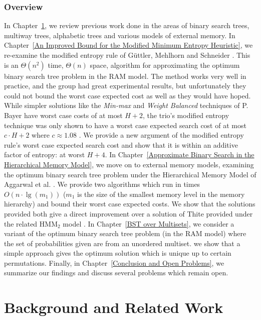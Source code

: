 \documentclass[]{beamer}
\theoremstyle{plain}
\begin{document}
\begin{frame} \frametitle{Overview}

In Chapter~\ref{Background and Related Work}, we review previous work done in the areas of binary search trees, multiway trees, alphabetic trees and various models of external memory. In Chapter~\ref{An Improved Bound for the Modified Minimum Entropy Heuristic}, we re-examine the modified entropy rule of G{\"u}ttler, Mehlhorn and Schneider \cite{guttler1980binary}. This is an $\Theta(n^2)$ time, $\Theta(n)$ space, algorithm for approximating the optimum binary search tree problem in the RAM model. The method works very well in practice, and the group had great experimental results, but unfortunately they could not bound the worst case expected cost as well as they would have hoped. While simpler solutions like the \textit{Min-max} and \textit{Weight Balanced} techniques of P. Bayer have worst case costs of at most $H+2$, the trio's modified entropy technique was only shown to have a worst case expected search cost of at most $c\cdot H+2$ where $c \approx 1.08$ \cite{bayer1975improved, guttler1980binary}. We provide a new argument of the modified entropy rule's worst case expected search cost and show that it is within an additive factor of entropy: at worst $H+4$. In Chapter~\ref{Approximate Binary Search in the Hierarchical Memory Model}, we move on to external memory models, examining the optimum binary search tree problem under the Hierarchical Memory Model of Aggarwal et al. \cite{aggarwal1987model}. We provide two algorithms which run in times $O(n\cdot\lg(m_1))$ ($m_1$ is the size of the smallest memory level in the memory hierarchy) and bound their worst case expected costs. We show that the solutions provided both give a direct improvement over a solution of Thite provided under the related HMM$_2$ model \cite{thite2008optimum}. In Chapter~\ref{BST over Multisets}, we consider a variant of the optimum binary search tree problem (in the RAM model) where the set of probabilities given are from an unordered multiset. we show that a simple approach gives the optimum solution which is unique up to certain permutations. Finally, in Chapter~\ref{Conclusion and Open Problems}, we summarize our findings and discuss several problems which remain open.
\end{frame}

\section{Background and Related Work} \label{Background and Related Work}
\end{document}
